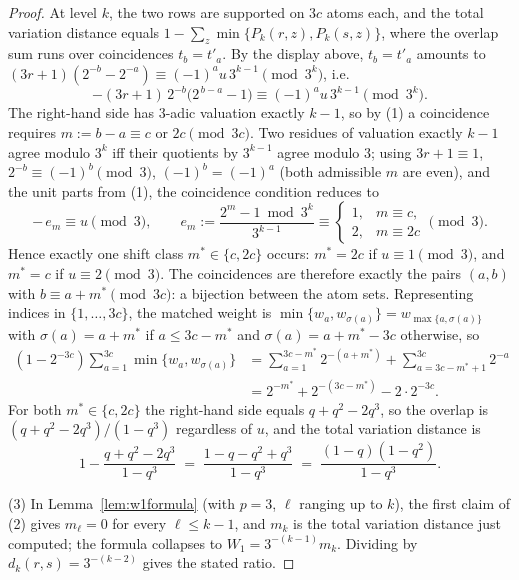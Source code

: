 \documentclass[11pt]{amsart}
\theoremstyle{definition}
\theoremstyle{remark}
\newcommand{\dW}{W_1}
\begin{document}
\begin{proof}
At level $k$, the two rows are supported on $3c$ atoms each, and the total variation distance equals $1 - \sum_z \min\{P_k(r,z), P_k(s,z)\}$, where the overlap sum runs over coincidences $t_b = t'_a$. By the display above, $t_b = t'_a$ amounts to $(3r+1)(2^{-b} - 2^{-a}) \equiv (-1)^a u\, 3^{k-1} \pmod{3^k}$, i.e.
\[
-(3r+1)\, 2^{-b} \bigl(2^{\,b-a} - 1\bigr) \equiv (-1)^a u\, 3^{k-1} \pmod{3^k}.
\]
The right-hand side has $3$-adic valuation exactly $k-1$, so by (1) a coincidence requires $m := b - a \equiv c$ or $2c \pmod{3c}$. Two residues of valuation exactly $k-1$ agree modulo $3^k$ iff their quotients by $3^{k-1}$ agree modulo $3$; using $3r+1 \equiv 1$, $2^{-b} \equiv (-1)^b \pmod 3$, $(-1)^b = (-1)^a$ (both admissible $m$ are even), and the unit parts from (1), the coincidence condition reduces to
\[
-\,e_m \equiv u \pmod 3, \qquad e_m := \frac{2^m - 1 \bmod 3^k}{3^{k-1}} \equiv \begin{cases} 1, & m \equiv c, \\ 2, & m \equiv 2c \end{cases} \pmod 3 .
\]
Hence exactly one shift class $m^* \in \{c, 2c\}$ occurs: $m^* = 2c$ if $u \equiv 1 \pmod 3$, and $m^* = c$ if $u \equiv 2 \pmod 3$. The coincidences are therefore exactly the pairs $(a, b)$ with $b \equiv a + m^* \pmod{3c}$: a bijection between the atom sets. Representing indices in $\{1, \dots, 3c\}$, the matched weight is $\min\{w_a, w_{\sigma(a)}\} = w_{\max\{a, \sigma(a)\}}$ with $\sigma(a) = a + m^*$ if $a \le 3c - m^*$ and $\sigma(a) = a + m^* - 3c$ otherwise, so
\begin{align*}
(1 - 2^{-3c}) \sum_{a=1}^{3c} \min\{w_a, w_{\sigma(a)}\}
&= \sum_{a=1}^{3c-m^*} 2^{-(a+m^*)} + \!\!\sum_{a = 3c-m^*+1}^{3c}\!\! 2^{-a} \\
&= 2^{-m^*} + 2^{-(3c - m^*)} - 2\cdot 2^{-3c} .
\end{align*}
For both $m^* \in \{c, 2c\}$ the right-hand side equals $q + q^2 - 2q^3$, so the overlap is $(q + q^2 - 2q^3)/(1 - q^3)$ regardless of $u$, and the total variation distance is
\[
1 - \frac{q + q^2 - 2q^3}{1 - q^3} \;=\; \frac{1 - q - q^2 + q^3}{1 - q^3} \;=\; \frac{(1-q)(1-q^2)}{1-q^3} .
\]

(3) In Lemma~\ref{lem:w1formula} (with $p = 3$, $\ell$ ranging up to $k$), the first claim of (2) gives $m_\ell = 0$ for every $\ell \le k-1$, and $m_k$ is the total variation distance just computed; the formula collapses to $\dW = 3^{-(k-1)} m_k$. Dividing by $d_k(r,s) = 3^{-(k-2)}$ gives the stated ratio.
\end{proof}
\end{document}
